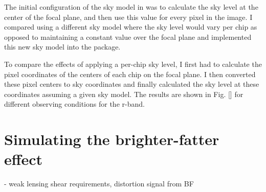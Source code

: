 The initial configuration of the sky model in  was to calculate the sky level at the center of the focal plane, and then use this value for every pixel in the image. I compared using a different sky model where the sky level would vary per chip as opposed to maintaining a constant value over the focal plane and implemented this new sky model into the  package.

To compare the effects of applying a per-chip sky level, I first had to calculate the pixel coordinates of the centers of each chip on the focal plane. I then converted these pixel centers to sky coordinates and finally calculated the sky level at these coordinates assuming a given sky model. The results are shown in Fig. [] for different observing conditions for the r-band. 



% 


\section{Simulating the brighter-fatter effect}

- weak lensing shear requirements, distortion signal from BF

